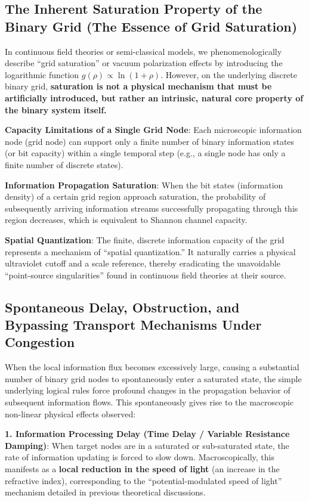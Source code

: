 \documentclass[12pt, a4paper]{article}
\begin{document}
\subsection{The Inherent Saturation Property of the Binary Grid (The Essence of Grid Saturation)}

In continuous field theories or semi-classical models, we phenomenologically describe ``grid saturation'' or vacuum polarization effects by introducing the logarithmic function $g(\rho) \propto \ln(1+\rho)$. However, on the underlying discrete binary grid, \textbf{saturation is not a physical mechanism that must be artificially introduced, but rather an intrinsic, natural core property of the binary system itself.}

\textbf{Capacity Limitations of a Single Grid Node}: Each microscopic information node (grid node) can support only a finite number of binary information states (or bit capacity) within a single temporal step (e.g., a single node has only a finite number of discrete states).

\textbf{Information Propagation Saturation}: When the bit states (information density) of a certain grid region approach saturation, the probability of subsequently arriving information streams successfully propagating through this region decreases, which is equivalent to Shannon channel capacity.

\textbf{Spatial Quantization}: The finite, discrete information capacity of the grid represents a mechanism of ``spatial quantization.'' It naturally carries a physical ultraviolet cutoff and a scale reference, thereby eradicating the unavoidable ``point-source singularities'' found in continuous field theories at their source.

\subsection{Spontaneous Delay, Obstruction, and Bypassing Transport Mechanisms Under Congestion}

When the local information flux becomes excessively large, causing a substantial number of binary grid nodes to spontaneously enter a saturated state, the simple underlying logical rules force profound changes in the propagation behavior of subsequent information flows. This spontaneously gives rise to the macroscopic non-linear physical effects observed:

\textbf{1. Information Processing Delay (Time Delay / Variable Resistance Damping)}: When target nodes are in a saturated or sub-saturated state, the rate of information updating is forced to slow down. Macroscopically, this manifests as a \textbf{local reduction in the speed of light} (an increase in the refractive index), corresponding to the ``potential-modulated speed of light'' mechanism detailed in previous theoretical discussions.
\end{document}
